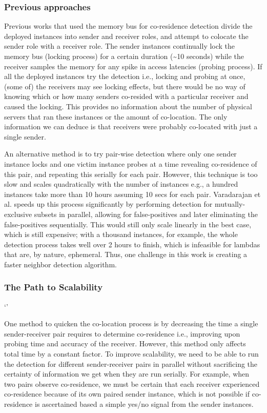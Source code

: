 \subsubsection{Previous approaches}
Previous works that used the memory bus for co-residence detection divide the
deployed instances into sender and receiver roles, and attempt to
colocate the sender role with a receiver role. The sender instances
continually lock the memory bus (locking process) for a certain duration
(\textasciitilde 10 seconds) while the receiver samples the memory for any spike
in access latencies (probing process). If all the deployed instances try the
detection i.e., locking and probing at once, (some of) the receivers may see
locking effects, but there would be no way of knowing which or how many senders
co-resided with a particular receiver and caused the locking. This provides
no information about the number of physical servers that ran these instances or
the amount of co-location. The only information we can deduce is that receivers
were probably co-located with just a single sender.

An alternative method is to try pair-wise detection where only one sender 
instance locks and one victim instance probes at a time revealing co-residence
of this pair, and repeating this serially for each pair. However, this technique
is too slow and scales quadratically with the number of instances e.g., a
hundred instances take more than 10 hours assuming 10 secs for each pair.
Varadarajan et al.\cite{varad191016} speeds up this process significantly by
performing detection for mutually-exclusive subsets in parallel, allowing for
false-positives and later eliminating the false-positives
sequentially. This would still only scale linearly in the best case, which is
still expensive; with a thousand instances, for example, the whole detection
process takes well over 2 hours to finish, which is infeasible for lambdas that
are, by nature, ephemeral. Thus, one challenge in this work is creating a faster
neighbor detection algorithm.

\subsubsection{The Path to Scalability}`'

One method to quicken the co-location process is by decreasing the time a single
sender-receiver pair requires to determine co-residence i.e., improving upon
probing time and accuracy of the receiver.  However, this method only affects
total time by a constant factor. To improve scalability, we need to be able to
run the detection for different sender-receiver pairs in parallel without
sacrificing the certainty of information we get when they are run serially.  For
example, when two pairs observe co-residence, we must be certain that each
receiver experienced co-residence because of its own paired sender instance, which
is not possible if co-residence is ascertained based a simple yes/no signal from
the sender instances. 

